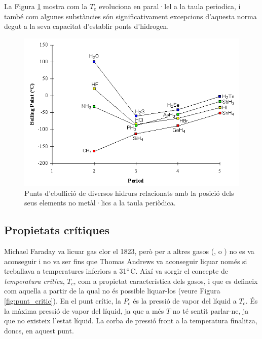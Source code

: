 La Figura \ref{fig:hidrurs_boiling_point} mostra com la $T_e$ evoluciona en paral·lel a la taula periodica, i també com algunes substàncies són significativament excepcions d'aquesta norma degut a la seva capacitat d'establir ponts d'hidrogen.
\begin{figure}[h]
\centering
\includegraphics[scale=0.4]{figures/hidrurs_boiling_point.png}
\caption{Punts d'ebullició de diversos hidrurs relacionats amb la posició dels seus elements no metàl·lics a la taula periòdica.}
\label{fig:hidrurs_boiling_point}
\end{figure}

\subsection{Propietats crítiques}
\label{sec:PropietatsCritiques}

Michael Faraday va licuar gas clor el 1823, però per a altres gasos (,  o ) no es va aconseguir i no va ser fins que Thomas Andrews va aconseguir liquar  només si treballava a temperatures inferiors a 31$\degree$C. Així va sorgir el concepte de \emph{temperatura crítica}, $T_c$, com a propietat característica dels gasos, i que es defineix com aquella a partir de la qual no és possible liquar-los (veure Figura \ref{fig:punt_critic}).
En el punt crític, la $P_c$ és la pressió de vapor del líquid a $T_c$. És la màxima pressió de vapor del líquid, ja que a més $T$ no té sentit parlar-ne, ja que no existeix l'estat líquid. La corba de pressió front a la temperatura finalitza, doncs, en aquest punt.

